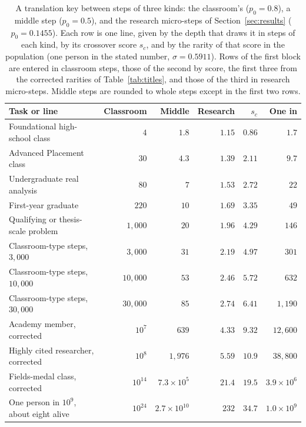 \documentclass{article}
\begin{document}
\begin{table}[ht]
  \centering
  \caption{A translation key between steps of three kinds: the classroom's ($p_0 = 0.8$), a middle step ($p_0 = 0.5$), and the research micro-steps of Section~\ref{sec:results} ($p_0 = 0.1455$). Each row is one line, given by the depth that draws it in steps of each kind, by its crossover score $s_c$, and by the rarity of that score in the population (one person in the stated number, $\sigma = 0.5911$). Rows of the first block are entered in classroom steps, those of the second by score, the first three from the corrected rarities of Table~\ref{tab:titles}, and those of the third in research micro-steps. Middle steps are rounded to whole steps except in the first two rows.}
  \label{tab:translation}
  \medskip\small\setlength{\tabcolsep}{4pt}
  \begin{tabular}{l r r r r r}
    \hline
    Task or line & Classroom & Middle & Research & $s_c$ & One in \\
    \hline
    Foundational high-school class & $4$ & $1.8$ & $1.15$ & $0.86$ & $1.7$ \\
    Advanced Placement class & $30$ & $4.3$ & $1.39$ & $2.11$ & $9.7$ \\
    Undergraduate real analysis & $80$ & $7$ & $1.53$ & $2.72$ & $22$ \\
    First-year graduate & $220$ & $10$ & $1.69$ & $3.35$ & $49$ \\
    Qualifying or thesis-scale problem & $1{,}000$ & $20$ & $1.96$ & $4.29$ & $146$ \\
    Classroom-type steps, $3{,}000$ & $3{,}000$ & $31$ & $2.19$ & $4.97$ & $301$ \\
    Classroom-type steps, $10{,}000$ & $10{,}000$ & $53$ & $2.46$ & $5.72$ & $632$ \\
    Classroom-type steps, $30{,}000$ & $30{,}000$ & $85$ & $2.74$ & $6.41$ & $1{,}190$ \\
    \hline
    Academy member, corrected & $10^{7}$ & $639$ & $4.33$ & $9.32$ & $12{,}600$ \\
    Highly cited researcher, corrected & $10^{8}$ & $1{,}976$ & $5.59$ & $10.9$ & $38{,}800$ \\
    Fields-medal class, corrected & $10^{14}$ & $7.3 \times 10^{5}$ & $21.4$ & $19.5$ & $3.9 \times 10^{6}$ \\
    One person in $10^{9}$, about eight alive & $10^{24}$ & $2.7 \times 10^{10}$ & $232$ & $34.7$ & $1.0 \times 10^{9}$ \\

\end{tabular}
\end{table}
\end{document}

